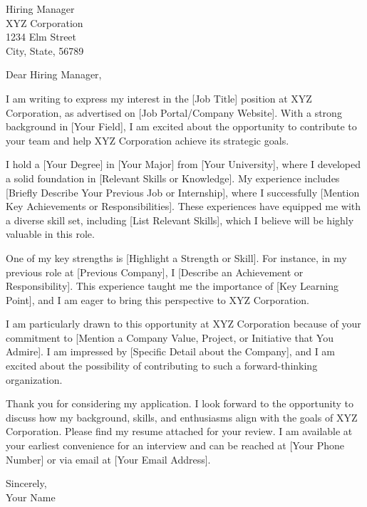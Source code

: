 \documentclass[12pt]{letter}
\begin{document}
\begin{letter}{Hiring Manager \\ XYZ Corporation \\ 1234 Elm Street \\ City, State, 56789}

\opening{Dear Hiring Manager,}

I am writing to express my interest in the [Job Title] position at XYZ Corporation, as advertised on [Job Portal/Company Website]. With a strong background in [Your Field], I am excited about the opportunity to contribute to your team and help XYZ Corporation achieve its strategic goals.

I hold a [Your Degree] in [Your Major] from [Your University], where I developed a solid foundation in [Relevant Skills or Knowledge]. My experience includes [Briefly Describe Your Previous Job or Internship], where I successfully [Mention Key Achievements or Responsibilities]. These experiences have equipped me with a diverse skill set, including [List Relevant Skills], which I believe will be highly valuable in this role.

One of my key strengths is [Highlight a Strength or Skill]. For instance, in my previous role at [Previous Company], I [Describe an Achievement or Responsibility]. This experience taught me the importance of [Key Learning Point], and I am eager to bring this perspective to XYZ Corporation.

I am particularly drawn to this opportunity at XYZ Corporation because of your commitment to [Mention a Company Value, Project, or Initiative that You Admire]. I am impressed by [Specific Detail about the Company], and I am excited about the possibility of contributing to such a forward-thinking organization.

Thank you for considering my application. I look forward to the opportunity to discuss how my background, skills, and enthusiasms align with the goals of XYZ Corporation. Please find my resume attached for your review. I am available at your earliest convenience for an interview and can be reached at [Your Phone Number] or via email at [Your Email Address].

\closing{Sincerely,\\[2\baselineskip] Your Name}

\end{letter}
\end{document}
